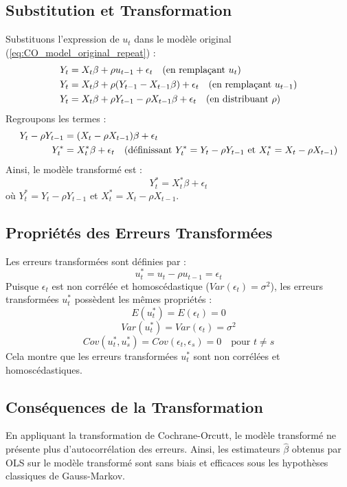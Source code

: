 \documentclass[14pt]{extarticle} %
\theoremstyle{definition}
\theoremstyle{plain}
\begin{document}
\subsection{Substitution et Transformation}
Substituons l'expression de \( u_t \) dans le modèle original (\ref{eq:CO_model_original_repeat}) :
\begin{align*}
Y_t &= X_t \beta + \rho u_{t-1} + \epsilon_t \quad \text{(en remplaçant \( u_t \))} \\
Y_t &= X_t \beta + \rho (Y_{t-1} - X_{t-1} \beta) + \epsilon_t \quad \text{(en remplaçant \( u_{t-1} \))} \\
Y_t &= X_t \beta + \rho Y_{t-1} - \rho X_{t-1} \beta + \epsilon_t \quad \text{(en distribuant \( \rho \))}
\end{align*}
Regroupons les termes :
\begin{align*}
Y_t - \rho Y_{t-1} &= (X_t - \rho X_{t-1}) \beta + \epsilon_t \\
Y_t^* &= X_t^* \beta + \epsilon_t \quad \text{(définissant \( Y_t^* = Y_t - \rho Y_{t-1} \) et \( X_t^* = X_t - \rho X_{t-1} \))}
\end{align*}
Ainsi, le modèle transformé est :
\[
Y_t^* = X_t^* \beta + \epsilon_t
\]
où \( Y_t^* = Y_t - \rho Y_{t-1} \) et \( X_t^* = X_t - \rho X_{t-1} \).

\subsection{Propriétés des Erreurs Transformées}
Les erreurs transformées sont définies par :
\[
u_t^* = u_t - \rho u_{t-1} = \epsilon_t
\]
Puisque \( \epsilon_t \) est non corrélée et homoscédastique (\( Var(\epsilon_t) = \sigma^2 \)), les erreurs transformées \( u_t^* \) possèdent les mêmes propriétés :
\[
E(u_t^*) = E(\epsilon_t) = 0
\]
\[
Var(u_t^*) = Var(\epsilon_t) = \sigma^2
\]
\[
Cov(u_t^*, u_s^*) = Cov(\epsilon_t, \epsilon_s) = 0 \quad \text{pour } t \neq s
\]
Cela montre que les erreurs transformées \( u_t^* \) sont non corrélées et homoscédastiques.

\subsection{Conséquences de la Transformation}
En appliquant la transformation de Cochrane-Orcutt, le modèle transformé ne présente plus d'autocorrélation des erreurs. Ainsi, les estimateurs \( \hat{\beta} \) obtenus par OLS sur le modèle transformé sont sans biais et efficaces sous les hypothèses classiques de Gauss-Markov.
\end{document}
